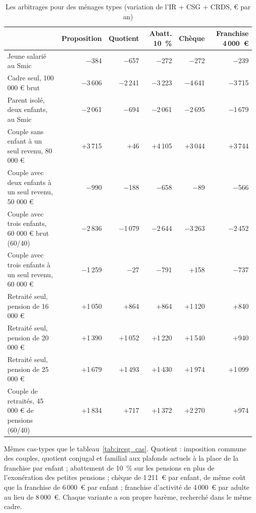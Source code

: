 \documentclass[11pt,a4paper]{article}
\begin{document}
\begin{table}[!htbp]\centering\scriptsize\setlength{\tabcolsep}{3pt}
\caption{Les arbitrages pour des ménages types (variation de l'IR + CSG + CRDS, € par an)}\label{tab:ircsg_arbcas}
{%
\begin{tabular}{@{}lrrrrr@{}}
\toprule
& Proposition & Quotient & Abatt. 10~\% & Chèque & Franchise 4\,000~€ \\
\midrule
Jeune salarié au Smic & $-$384 & $-$657 & $-$272 & $-$272 & $-$239 \\
Cadre seul, 100 000 € brut & $-$3\,606 & $-$2\,241 & $-$3\,223 & $-$4\,641 & $-$3\,715 \\
Parent isolé, deux enfants, au Smic & $-$2\,061 & $-$694 & $-$2\,061 & $-$2\,695 & $-$1\,679 \\
Couple sans enfant à un seul revenu, 80 000 € & +3\,715 & +46 & +4\,105 & +3\,044 & +3\,744 \\
Couple avec deux enfants à un seul revenu, 50 000 € & $-$990 & $-$188 & $-$658 & $-$89 & $-$566 \\
Couple avec trois enfants, 60 000 € brut (60/40) & $-$2\,836 & $-$1\,079 & $-$2\,644 & $-$3\,263 & $-$2\,452 \\
Couple avec trois enfants à un seul revenu, 60 000 € & $-$1\,259 & $-$27 & $-$791 & +158 & $-$737 \\
Retraité seul, pension de 16 000 € & +1\,050 & +864 & +864 & +1\,120 & +840 \\
Retraité seul, pension de 20 000 € & +1\,390 & +1\,052 & +1\,220 & +1\,540 & +940 \\
Retraité seul, pension de 25 000 € & +1\,679 & +1\,493 & +1\,430 & +1\,974 & +1\,099 \\
Couple de retraités, 45 000 € de pensions (60/40) & +1\,834 & +717 & +1\,372 & +2\,270 & +974 \\
\bottomrule
\end{tabular}}
\par\vspace{3pt}\parbox{\linewidth}{\raggedright\scriptsize\color{encre}
Mêmes cas-types que le tableau~\ref{tab:ircsg_cas}. Quotient : imposition commune des couples, quotient conjugal et familial aux plafonds actuels à la place de la franchise par enfant ; abattement de 10~\% sur les pensions en plus de l'exonération des petites pensions ; chèque de 1\,211~€ par enfant, de même coût que la franchise de 6\,000~€ par enfant ; franchise d'activité de 4\,000~€ par adulte au lieu de 8\,000~€. Chaque variante a son propre barème, recherché dans le même cadre.}
\end{table}
\end{document}
